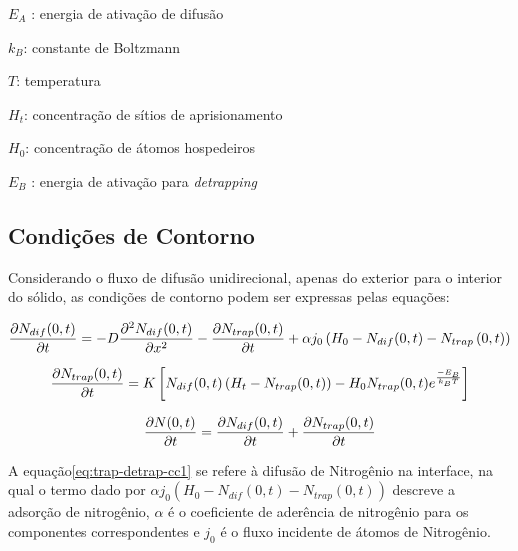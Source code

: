 $E_A$ : energia de ativação de difusão

$k_B$: constante de Boltzmann 
	
$T$: temperatura

$H_t$: concentração de sítios de aprisionamento

$H_0$: concentração de átomos hospedeiros
	
$E_B$ : energia de ativação para \textit{detrapping}


\subsection{Condições de Contorno}
\label{sec:trap-detrap-cc}

Considerando o fluxo de difusão unidirecional, apenas do exterior para o interior do sólido, as condições de contorno podem ser expressas pelas equações:

\begin{equation}
\label{eq:trap-detrap-cc1}
\pdv{N_{dif}(0,t)}{t} = -D\pdv[2]{N_{dif}(0,t)}{x} - \pdv{N_{trap}(0,t)}{t}  +\alpha j_{0}\left(H_0-N_{dif}(0,t)-N_{trap}\left(0,t\right)\right)
\end{equation}

\begin{equation}
\label{eq:trap-detrap-cc2}
\pdv{N_{trap}(0,t)}{t} = K\left[N_{dif}(0,t)\left(H_t-N_{trap}(0,t)\right) - H_0 N_{trap}(0,t)e^{\frac{-E_B}{k_BT}}\right] 
\end{equation}

\begin{equation}
\label{eq:trap-detrap-cc3}
\pdv{N(0,t)}{t} = \pdv{N_{dif}(0,t)}{t} + \pdv{N_{trap}(0,t)}{t}
\end{equation}

A equação\autoref{eq:trap-detrap-cc1} se refere à difusão de Nitrogênio na interface, na qual o termo dado por $\alpha j_{0}\left(H_0-N_{dif}(0,t)-N_{trap}\left(0,t\right)\right)$ descreve a adsorção de nitrogênio, $\alpha$ é o coeficiente de aderência de nitrogênio para os componentes correspondentes  e  $j_0$ é o fluxo incidente de átomos de Nitrogênio.
